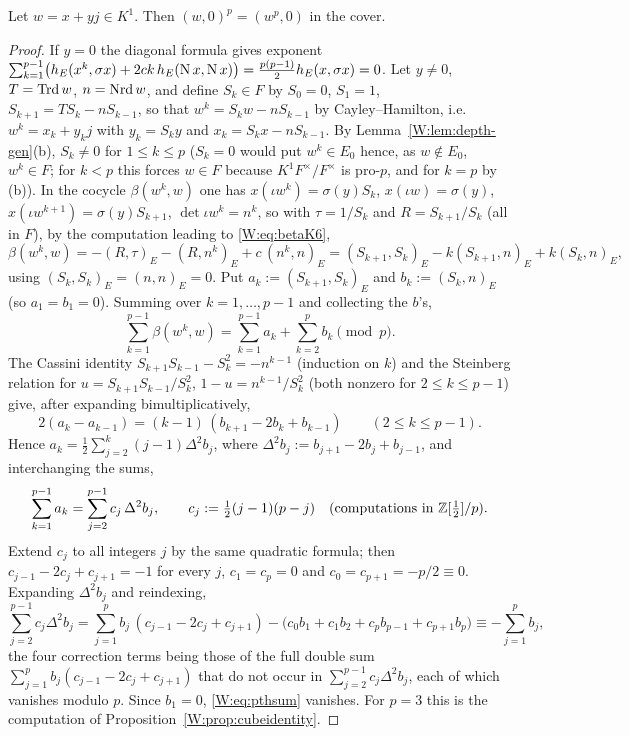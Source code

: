 \begin{theorem}\label{W:thm:pthpower}
Let $w=x+yj\in K^1$.  Then $(w,0)^p=(w^p,0)$ in the cover.
\end{theorem}
\begin{proof}
If $y=0$ the diagonal formula gives exponent
$\sum_{k=1}^{p-1}\bigl(h_E(x^k,\sigma x)+2ck\,h_E(\operatorname N x,\operatorname N x)\bigr)=\tfrac{p(p-1)}2h_E(x,\sigma x)=0$.
Let $y\ne0$, $T=\operatorname{Trd} w$, $n=\operatorname{Nrd} w$, and define $S_k\in F$ by
$S_0=0$, $S_1=1$, $S_{k+1}=TS_k-nS_{k-1}$, so that
$w^k=S_kw-nS_{k-1}$ by Cayley--Hamilton, i.e.\ $w^k=x_k+y_kj$ with
$y_k=S_ky$ and $x_k=S_kx-nS_{k-1}$.  By Lemma~\ref{W:lem:depth-gen}(b),
$S_k\ne0$ for $1\le k\le p$ ($S_k=0$ would put $w^k\in E_0$ hence,
as $w\notin E_0$, $w^k\in F$; for $k<p$ this forces $w\in F$ because
$K^1F^\times/F^\times$ is pro-$p$, and for $k=p$ by (b)).  In the cocycle
$\beta(w^k,w)$ one has $x(\iota w^k)=\sigma(y)S_k$, $x(\iota w)=\sigma(y)$,
$x(\iota w^{k+1})=\sigma(y)S_{k+1}$, $\det\iota w^k=n^k$, so with
$\tau=1/S_k$ and $R=S_{k+1}/S_k$ (all in $F$), by the computation
leading to \eqref{W:eq:betaK6},
\[
 \beta(w^k,w)=-(R,\tau)_E-(R,n^k)_E+c\,(n^k,n)_E
 =(S_{k+1},S_k)_E-k(S_{k+1},n)_E+k(S_k,n)_E ,
\]
using $(S_k,S_k)_E=(n,n)_E=0$.  Put $a_k:=(S_{k+1},S_k)_E$ and
$b_k:=(S_k,n)_E$ (so $a_1=b_1=0$).  Summing over $k=1,\dots,p-1$ and
collecting the $b$'s,
\begin{equation}\label{W:eq:pthsum}
 \sum_{k=1}^{p-1}\beta(w^k,w)=\sum_{k=1}^{p-1}a_k+\sum_{k=2}^{p}b_k\pmod p .
\end{equation}
The Cassini identity $S_{k+1}S_{k-1}-S_k^2=-n^{k-1}$ (induction on
$k$) and the Steinberg relation for $u=S_{k+1}S_{k-1}/S_k^2$,
$1-u=n^{k-1}/S_k^2$ (both nonzero for $2\le k\le p-1$) give, after
expanding bimultiplicatively,
\[
 2(a_k-a_{k-1})=(k-1)\,(b_{k+1}-2b_k+b_{k-1})\qquad(2\le k\le p-1).
\]
Hence $a_k=\tfrac12\sum_{j=2}^k(j-1)\Delta^2b_j$, where
$\Delta^2b_j:=b_{j+1}-2b_j+b_{j-1}$, and interchanging the sums,
\[
 \sum_{k=1}^{p-1}a_k=\sum_{j=2}^{p-1}c_j\,\Delta^2b_j,\qquad
 c_j:=\tfrac12(j-1)(p-j)\quad(\text{computations in }\mathbb Z[\tfrac12]/p).
\]
Extend $c_j$ to all integers $j$ by the same quadratic formula; then
$c_{j-1}-2c_j+c_{j+1}=-1$ for every $j$, $c_1=c_p=0$ and
$c_0=c_{p+1}=-p/2\equiv0$.  Expanding $\Delta^2b_j$ and reindexing,
\[
 \sum_{j=2}^{p-1}c_j\Delta^2b_j
 =\sum_{j=1}^{p}b_j\,(c_{j-1}-2c_j+c_{j+1})
  -\bigl(c_0b_1+c_1b_2+c_pb_{p-1}+c_{p+1}b_p\bigr)
 \equiv-\sum_{j=1}^{p}b_j ,
\]
the four correction terms being those of the full double sum
$\sum_{j=1}^p b_j(c_{j-1}-2c_j+c_{j+1})$ that do not occur in
$\sum_{j=2}^{p-1}c_j\Delta^2b_j$, each of which vanishes modulo $p$.
Since $b_1=0$, \eqref{W:eq:pthsum} vanishes.  For $p=3$ this is the computation of
Proposition~\ref{W:prop:cubeidentity}.
\end{proof}


